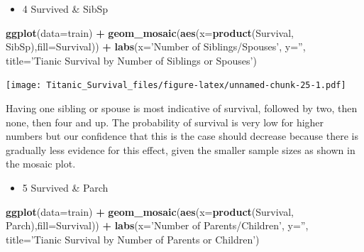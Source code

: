 \documentclass[]{article}
\newenvironment{Shaded}{\begin{snugshade}}{\end{snugshade}}
\newcommand{\KeywordTok}[1]{\textcolor[rgb]{0.13,0.29,0.53}{\textbf{#1}}}
\newcommand{\DataTypeTok}[1]{\textcolor[rgb]{0.13,0.29,0.53}{#1}}
\newcommand{\StringTok}[1]{\textcolor[rgb]{0.31,0.60,0.02}{#1}}
\newcommand{\OperatorTok}[1]{\textcolor[rgb]{0.81,0.36,0.00}{\textbf{#1}}}
\newcommand{\NormalTok}[1]{#1}
\providecommand{\tightlist}{%
  \setlength{\itemsep}{0pt}\setlength{\parskip}{0pt}}
\begin{document}
\begin{itemize}
\tightlist
\item
  4 Survived \& SibSp
\end{itemize}

\begin{Shaded}
\begin{Highlighting}[]
\KeywordTok{ggplot}\NormalTok{(}\DataTypeTok{data=}\NormalTok{train) }\OperatorTok{+}
\StringTok{   }\KeywordTok{geom_mosaic}\NormalTok{(}\KeywordTok{aes}\NormalTok{(}\DataTypeTok{x=}\KeywordTok{product}\NormalTok{(Survival, SibSp),}\DataTypeTok{fill=}\NormalTok{Survival)) }\OperatorTok{+}
\StringTok{   }\KeywordTok{labs}\NormalTok{(}\DataTypeTok{x=}\StringTok{'Number of Siblings/Spouses'}\NormalTok{, }\DataTypeTok{y=}\StringTok{''}\NormalTok{, }
   \DataTypeTok{title=}\StringTok{'Tianic Survival by Number of Siblings or Spouses'}\NormalTok{)}
\end{Highlighting}
\end{Shaded}

\texttt{[image: Titanic\_Survival\_files/figure-latex/unnamed-chunk-25-1.pdf]}

Having one sibling or spouse is most indicative of survival, followed by
two, then none, then four and up. The probability of survival is very
low for higher numbers but our confidence that this is the case should
decrease because there is gradually less evidence for this effect, given
the smaller sample sizes as shown in the mosaic plot.

\begin{itemize}
\tightlist
\item
  5 Survived \& Parch
\end{itemize}

\begin{Shaded}
\begin{Highlighting}[]
\KeywordTok{ggplot}\NormalTok{(}\DataTypeTok{data=}\NormalTok{train) }\OperatorTok{+}
\StringTok{   }\KeywordTok{geom_mosaic}\NormalTok{(}\KeywordTok{aes}\NormalTok{(}\DataTypeTok{x=}\KeywordTok{product}\NormalTok{(Survival, Parch),}\DataTypeTok{fill=}\NormalTok{Survival)) }\OperatorTok{+}
\StringTok{   }\KeywordTok{labs}\NormalTok{(}\DataTypeTok{x=}\StringTok{'Number of Parents/Children'}\NormalTok{, }\DataTypeTok{y=}\StringTok{''}\NormalTok{, }
   \DataTypeTok{title=}\StringTok{'Tianic Survival by Number of Parents or Children'}\NormalTok{)}
\end{Highlighting}
\end{Shaded}
\end{document}
